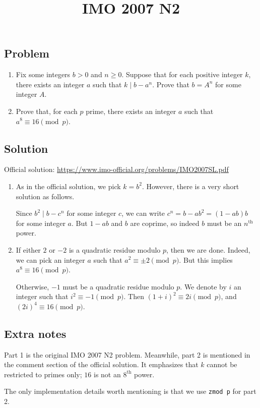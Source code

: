 \documentclass{article}
\title{IMO 2007 N2}
\author{}
\date{}
\begin{document}
\maketitle



\subsection*{Problem}

\begin{enumerate}

\item
Fix some integers $b > 0$ and $n \geq 0$.
Suppose that for each positive integer $k$, there exists an integer $a$ such that $k \mid b - a^n$.
Prove that $b = A^n$ for some integer $A$.

\item
Prove that, for each $p$ prime, there exists an integer $a$ such that $a^8 \equiv 16 \pmod{p}$.

\end{enumerate}



\subsection*{Solution}

Official solution: \url{https://www.imo-official.org/problems/IMO2007SL.pdf}

\begin{enumerate}

\item
As in the official solution, we pick $k = b^2$.
However, there is a very short solution as follows.

Since $b^2 \mid b - c^n$ for some integer $c$, we can write $c^n = b - ab^2 = (1 - ab) b$ for some integer $a$.
But $1 - ab$ and $b$ are coprime, so indeed $b$ must be an $n^{\text{th}}$ power.

\item
If either $2$ or $-2$ is a quadratic residue modulo $p$, then we are done.
Indeed, we can pick an integer $a$ such that $a^2 \equiv \pm 2 \pmod{p}$.
But this implies $a^8 \equiv 16 \pmod{p}$.

Otherwise, $-1$ must be a quadratic residue modulo $p$.
We denote by $i$ an integer such that $i^2 \equiv -1 \pmod{p}$.
Then $(1 + i)^2 \equiv 2i \pmod{p}$, and $(2i)^4 \equiv 16 \pmod{p}$.

\end{enumerate}



\subsection*{Extra notes}

Part 1 is the original IMO 2007 N2 problem.
Meanwhile, part 2 is mentioned in the comment section of the official solution.
It emphasizes that $k$ cannot be restricted to primes only; $16$ is not an $8^{\text{th}}$ power.

The only implementation details worth mentioning is that we use \texttt{zmod p} for part 2.
\end{document}

